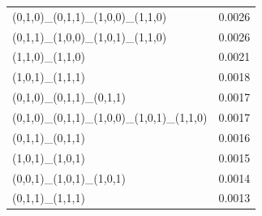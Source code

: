 \begin{minipage}[t]{\linewidth}
\begin{tabular}{@{}lr@{}}
(0,1,0)\_(0,1,1)\_(1,0,0)\_(1,1,0)                & 0.0026 \\
(0,1,1)\_(1,0,0)\_(1,0,1)\_(1,1,0)                & 0.0026 \\
(1,1,0)\_(1,1,0)                                   & 0.0021 \\
(1,0,1)\_(1,1,1)                                   & 0.0018 \\
(0,1,0)\_(0,1,1)\_(0,1,1)                         & 0.0017 \\
(0,1,0)\_(0,1,1)\_(1,0,0)\_(1,0,1)\_(1,1,0)      & 0.0017 \\
(0,1,1)\_(0,1,1)                                   & 0.0016 \\
(1,0,1)\_(1,0,1)                                   & 0.0015 \\
(0,0,1)\_(1,0,1)\_(1,0,1)                         & 0.0014 \\
(0,1,1)\_(1,1,1)                                   & 0.0013 \\
\bottomrule
\end{tabular}
\end{minipage}
\hfill
